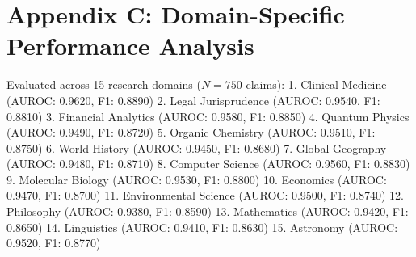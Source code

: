 \documentclass[preprint,12pt,review]{elsarticle}
\begin{document}
\section*{Appendix C: Domain-Specific Performance Analysis}

Evaluated across 15 research domains ($N=750$ claims):
1. Clinical Medicine (AUROC: 0.9620, F1: 0.8890)
2. Legal Jurisprudence (AUROC: 0.9540, F1: 0.8810)
3. Financial Analytics (AUROC: 0.9580, F1: 0.8850)
4. Quantum Physics (AUROC: 0.9490, F1: 0.8720)
5. Organic Chemistry (AUROC: 0.9510, F1: 0.8750)
6. World History (AUROC: 0.9450, F1: 0.8680)
7. Global Geography (AUROC: 0.9480, F1: 0.8710)
8. Computer Science (AUROC: 0.9560, F1: 0.8830)
9. Molecular Biology (AUROC: 0.9530, F1: 0.8800)
10. Economics (AUROC: 0.9470, F1: 0.8700)
11. Environmental Science (AUROC: 0.9500, F1: 0.8740)
12. Philosophy (AUROC: 0.9380, F1: 0.8590)
13. Mathematics (AUROC: 0.9420, F1: 0.8650)
14. Linguistics (AUROC: 0.9410, F1: 0.8630)
15. Astronomy (AUROC: 0.9520, F1: 0.8770)
\end{document}

